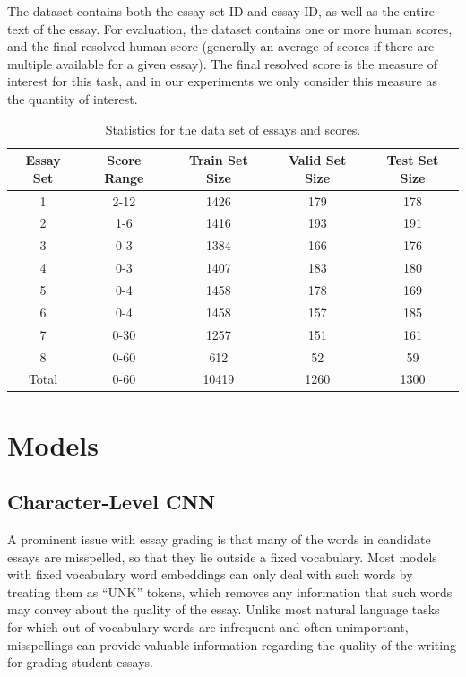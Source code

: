 \documentclass[10pt,psamsfonts]{amsart}
\theoremstyle{definition}
\theoremstyle{remark}
\numberwithin{equation}{section}
\begin{document}
The dataset contains both the essay set ID and essay ID, as well as the entire text of the essay. For evaluation, the dataset contains one or more human scores, and the final resolved human score (generally an average of scores if there are multiple available for a given essay). The final resolved score is the measure of interest for this task, and in our experiments we only consider this measure as the quantity of interest.

\begin{table}
	\begin{tabular}{c|c|c|c|c}
		Essay Set & Score Range & Train Set Size & Valid Set Size & Test Set Size\\\hline
		1 & 2-12 & 1426 & 179 & 178\\
		2 & 1-6 & 1416 & 193 & 191\\
		3 & 0-3 & 1384 & 166 & 176\\
		4 & 0-3 & 1407 & 183 & 180 \\
		5 & 0-4 & 1458 & 178 & 169\\
		6 & 0-4 & 1458 & 157 & 185\\
		7 & 0-30 & 1257 & 151 & 161\\ 
		8 & 0-60 & 612 & 52 & 59\\\hline
		Total & 0-60 & 10419 & 1260 & 1300
	\end{tabular}
	\caption{Statistics for the data set of essays and scores.}
	\label{fig:data}
\end{table}

\section*{Models}

\subsection*{Character-Level CNN}

A prominent issue with essay grading is that many of the words in candidate essays are misspelled, so that they lie outside a fixed vocabulary. Most models with fixed vocabulary word embeddings can only deal with such words by treating them as ``UNK'' tokens, which removes any information that such words may convey about the quality of the essay. Unlike most natural language tasks for which out-of-vocabulary words are infrequent and often unimportant, misspellings can provide valuable information regarding the quality of the writing for grading student essays.
\end{document}
